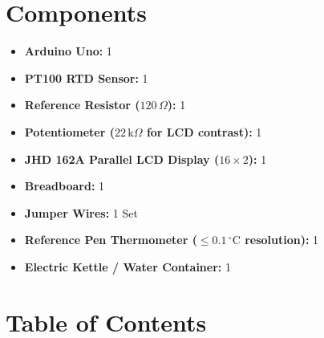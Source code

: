 \documentclass[journal,12pt,onecolumn]{IEEEtran}
\begin{document}
	\section{Components}
	\begin{itemize}
		\item \textbf{Arduino Uno:} 1
		\item \textbf{PT100 RTD Sensor:} 1
		\item \textbf{Reference Resistor ($120\,\Omega$):} 1
		\item \textbf{Potentiometer ($22\,\text{k}\Omega$ for LCD contrast):} 1
		\item \textbf{JHD 162A Parallel LCD Display ($16\times2$):} 1
		\item \textbf{Breadboard:} 1
		\item \textbf{Jumper Wires:} 1 Set
		\item \textbf{Reference Pen Thermometer ($\le 0.1\,^\circ\text{C}$ resolution):} 1
		\item \textbf{Electric Kettle / Water Container:} 1
	\end{itemize}

	\newpage

    \section*{Table of Contents}


\vspace{1cm}
\end{document}
